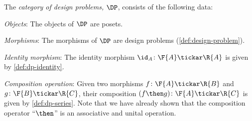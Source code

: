 \begin{definition}[Category $\DP$]
\label{define:DP}
The \emph{category of design problems, $\DP$}, consists of the following data:
%
\begin{compactenum}
\item \emph{Objects}: The objects of $\DP$ are posets.
\item \emph{Morphisms}: The morphisms of $\DP$ are design problems (\cref{def:design-problem}).
\item \emph{Identity morphism}: The identity morphism $\id_A \colon \F{A} \tickar \R{A}$ is given by \cref{def:dp-identity}.
\item \emph{Composition operation}: Given two morphisms $f \colon  \F{A} \tickar \R{B}$ and $g \colon \F{B} \tickar \R{C}$, their
composition $(f\then g)\colon  \F{A} \tickar \R{C}$ is
given by \cref{def:dp-series}.
Note that we have already shown that the composition operator ``$\then$'' is an associative and unital operation.
\end{compactenum}
\end{definition}